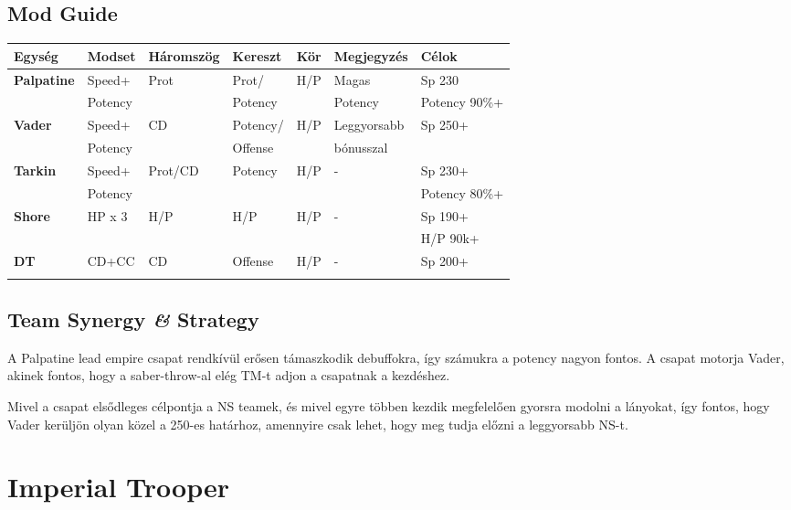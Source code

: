 \documentclass[11pt]{report}
\begin{document}
\section{Mod Guide}
\begin{center}
    \begin{tabular}{|l | l | l | l | l | l | l |}
        \hline
        Egység & Modset & Háromszög & Kereszt & Kör & Megjegyzés & Célok\\ \hline
        \textbf{Palpatine} & Speed+ & Prot & Prot/ & H/P & Magas & Sp 230\\
        & Potency &  & Potency &  & Potency & Potency 90\%+\\ \hline
        \textbf{Vader} & Speed+ & CD & Potency/ & H/P & Leggyorsabb & Sp 250+\\
        & Potency &  & Offense &  & bónusszal & \\ \hline
        \textbf{Tarkin} & Speed+ & Prot/CD & Potency & H/P & - & Sp 230+\\
        & Potency &  &  &  &  & Potency 80\%+\\ \hline
        \textbf{Shore} & HP x 3 & H/P & H/P & H/P & - & Sp 190+\\
        &  &  &  &  &  & H/P 90k+\\ \hline
        \textbf{DT} & CD+CC & CD & Offense & H/P & - & Sp 200+\\
        &  &  &  &  &  & \\ \hline
    \end{tabular}
\end{center}
\section{Team Synergy \textit{\&} Strategy}
A Palpatine lead empire csapat rendkívül erősen támaszkodik debuffokra, így számukra a potency nagyon fontos. A csapat motorja Vader, akinek fontos, hogy a saber-throw-al elég TM-t adjon a csapatnak a kezdéshez.\par
Mivel a csapat elsődleges célpontja a NS teamek, és mivel egyre többen kezdik megfelelően gyorsra modolni a lányokat, így fontos, hogy Vader kerüljön olyan közel a 250-es határhoz, amennyire csak lehet, hogy meg tudja előzni a leggyorsabb NS-t.

\chapter{Imperial Trooper}
\end{document}
